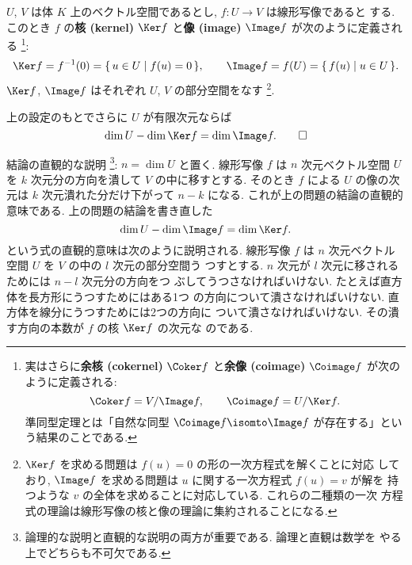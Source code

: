 \documentclass[12pt,twoside]{jarticle}
\begin{document}
\bigskip

$U$, $V$ は体 $K$ 上のベクトル空間であるとし, $f:U\to V$ は線形写像であると
する.  このとき $f$ の{\bf 核 (kernel)} $\Ker f$ 
と{\bf 像 (image)} $\Image f$ が次のように定義される%
\footnote{実はさらに{\bf 余核 (cokernel)} $\Coker f$ 
  と{\bf 余像 (coimage)} $\Coimage f$ が次のように定義される:
  \begin{equation*}
    \Coker f = V/\Image f,
    \qquad 
    \Coimage f = U/\Ker f.
  \end{equation*}
  準同型定理とは「自然な同型 $\Coimage f \isomto \Image f$ が存在する」とい
  う結果のことである.}:
\begin{equation*}
  \Ker f = f^{-1}(0) = \{\, u\in U \mid f(u) = 0 \,\},
  \qquad
  \Image f = f(U) = \{\, f(u) \mid u \in U \,\}.
\end{equation*}
$\Ker f$, $\Image f$ はそれぞれ $U$, $V$  の部分空間をなす%
\footnote{$\Ker f$ を求める問題は $f(u)=0$ の形の一次方程式を解くことに対応
  しており, $\Image f$ を求める問題は $u$ に関する一次方程式 $f(u)=v$ が解を
  持つような $v$ の全体を求めることに対応している.  これらの二種類の一次
  方程式の理論は線形写像の核と像の理論に集約されることになる.}.

\begin{question}
\label{q:Ker-Image-1}
  上の設定のもとでさらに $U$ が有限次元ならば
  \begin{equation*}
    \dim U - \dim\Ker f = \dim\Image f.
    \qed
  \end{equation*}
\end{question}

\noindent
結論の直観的な説明%
\footnote{論理的な説明と直観的な説明の両方が重要である.  論理と直観は数学を
  やる上でどちらも不可欠である.}: %
$n=\dim U$ と置く.
線形写像 $f$ は $n$ 次元ベクトル空間 $U$ 
を $k$ 次元分の方向を潰して $V$ の中に移すとする.
そのとき $f$ による $U$ の像の次元は $k$ 次元潰れた分だけ下がって $n-k$ 
になる. これが上の問題の結論の直観的意味である.  上の問題の結論を書き直した
\begin{equation*}
    \dim U - \dim\Image f = \dim\Ker f.
\end{equation*}
という式の直観的意味は次のように説明される.  
線形写像 $f$ は $n$ 次元ベクトル空間 $U$ を $V$ の中の $l$ 次元の部分空間う
つすとする.  $n$ 次元が $l$ 次元に移されるためには $n-l$ 次元分の方向をつ
ぶしてうつさなければいけない.  たとえば直方体を長方形にうつすためにはある1つ
の方向について潰さなければいけない.  直方体を線分にうつすためには2つの方向に
ついて潰さなければいけない.  その潰す方向の本数が $f$ の核 $\Ker f$ の次元な
のである.
\end{document}
